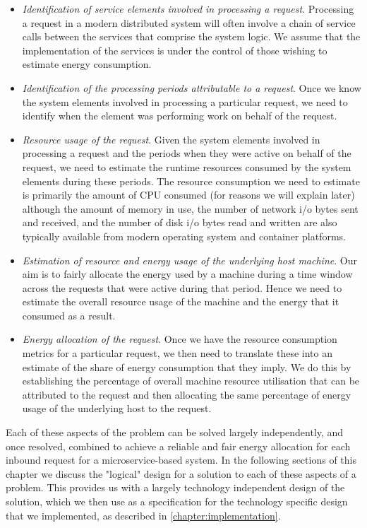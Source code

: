 \begin{itemize}

\item \emph{Identification of service elements involved in processing a request}.  Processing a request in a modern distributed system will often involve a chain of service calls between the services that comprise the system logic.  We assume that the implementation of the services is under the control of those wishing to estimate energy consumption.

\item \emph{Identification of the processing periods attributable to a request}.  Once we know the system elements involved in processing a particular request, we need to identify when the element was performing work on behalf of the request.

\item \emph{Resource usage of the request}.  Given the system elements involved in processing a request and the periods when they were active on behalf of the request, we need to estimate the runtime resources consumed by the system elements during these periods.  The resource consumption we need to estimate is primarily the amount of CPU consumed (for reasons we will explain later) although the amount of memory in use, the number of network i/o bytes sent and received, and the number of disk i/o bytes read and written are also typically available from modern operating system and container platforms.

\item \emph{Estimation of resource and energy usage of the underlying host machine}.  Our aim is to fairly allocate the energy used by a machine during a time window across the requests that were active during that period.  Hence we need to estimate the overall resource usage of the machine and the energy that it consumed as a result.  

\item \emph{Energy allocation of the request}.  Once we have the resource consumption metrics for a particular request, we then need to translate these into an estimate of the share of energy consumption that they imply.  We do this by establishing the percentage of overall machine resource utilisation that can be attributed to the request and then allocating the same percentage of energy usage of the underlying host to the request.

\end{itemize}

Each of these aspects of the problem can be solved largely independently, and once resolved, combined to achieve a reliable and fair energy allocation for each inbound request for a microservice-based system.  In the following sections of this chapter we discuss the "logical" design for a solution to each of these aspects of a problem.  This provides us with a largely technology independent design of the solution, which we then use as a specification for the technology specific design that we implemented, as described in \cref{chapter:implementation}.

